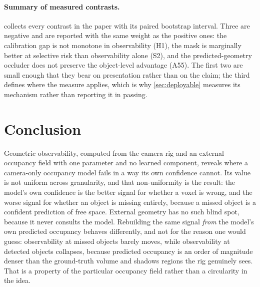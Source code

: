 \documentclass[10pt,twocolumn,letterpaper]{article}
\begin{document}
\paragraph{Summary of measured contrasts.}
 collects every contrast in the paper with its paired
bootstrap interval. Three are negative and are reported with the same
weight as the positive ones: the calibration gap is not monotone in
observability (H1), the mask is marginally better at selective risk than
observability alone (S2), and the predicted-geometry occluder does not
preserve the object-level advantage (A55). The first two are small enough
that they bear on presentation rather than on the claim; the third defines
where the measure applies, which is why \cref{sec:deployable} measures its
mechanism rather than reporting it in passing.




\section{Conclusion}
Geometric observability, computed from the camera rig and an external
occupancy field with one parameter and no learned component, reveals where
a camera-only occupancy model fails in a way its own confidence cannot.
Its value is not uniform across granularity, and that non-uniformity is the
result: the model's own confidence is the better signal for whether a voxel
is wrong, and the worse signal for whether an object is missing entirely,
because a missed object is a confident prediction of free space. External
geometry has no such blind spot, because it never consults the model.
Rebuilding the same signal \emph{from} the model's own predicted occupancy
behaves differently, and not for the reason one would guess: observability
at missed objects barely moves, while observability at detected objects
collapses, because predicted occupancy is an order of magnitude denser than
the ground-truth volume and shadows regions the rig genuinely sees. That is
a property of the particular occupancy field rather than a circularity in
the idea.
\end{document}
